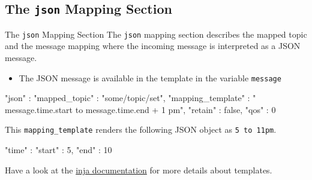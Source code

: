 ﻿\subsection{The \alert{\texttt{json}} Mapping Section}

\begin{frame}[fragile]{The \alert{\texttt{json}} Mapping Section}
  The \textcolor{fh-ooe-red}{\texttt{json}} mapping section describes the \alert{mapped topic} and the \alert{message mapping} where the \alert{incoming message} is \alert{interpreted as a JSON message}.
  \begin{itemize}
  \item The \alert{JSON message} is available in the template in the variable \texttt{\textcolor{grassgreen}{message}}
  \end{itemize}
  \begin{jsoncode}[autogobble=true,morekeywords={[3]{message}},keywordstyle={[3]\textcolor{grassgreen}}]
        "json" : {
            "mapped_topic" : "some/topic/set",
            "mapping_template" : "{{ message.time.start }} to {{ message.time.end + 1 }}pm",
            "retain" : false,
            "qos" : 0
        }
  \end{jsoncode}
  This \texttt{\textcolor{fh-ooe-red}{mapping\_template}} renders the following JSON object as \texttt{\textcolor{fh-ooe-red}{5 to 11pm}}.

  \begin{jsoncode}[gobble=4]
    {
        "time" : {
            "start" : 5,
            "end" : 10
        }
    }
  \end{jsoncode}
  Have a look at the \alert{\href{https://github.com/pantor/inja/tree/master}{inja documentation}} for more details about templates.
\end{frame}
